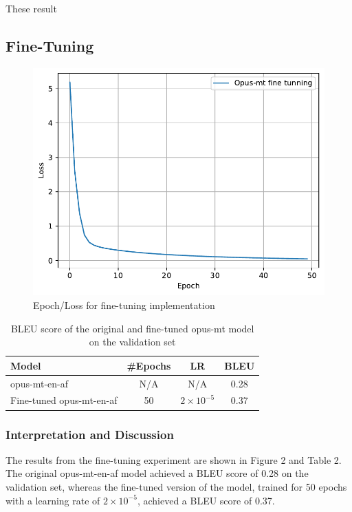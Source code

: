 These result
\subsection{Fine-Tuning}
\begin{figure}[H]
	\centering
	\includegraphics[width=0.9\linewidth]{./figures/fine_tunning.pdf}
	\caption{Epoch/Loss for fine-tuning implementation}
\end{figure}

\begin{table}[H]
	\centering
	\begin{tabular}{lccc}
		\toprule
		Model                 & \#Epochs & LR              & BLEU \\
		\midrule
		opus-mt-en-af         & N/A      & N/A             & 0.28 \\
		Fine-tuned opus-mt-en-af & 50      & $2\times10^{-5}$ & 0.37 \\
		\bottomrule
	\end{tabular}
	\caption{BLEU score of the original and fine-tuned opus-mt model on the validation set}
\end{table}

\subsubsection{Interpretation and Discussion}
The results from the fine-tuning experiment are shown in Figure 2 and Table 2. The original opus-mt-en-af model achieved a BLEU score of 0.28 on the validation set, whereas the fine-tuned version of the model, trained for 50 epochs with a learning rate of $2\times10^{-5}$, achieved a BLEU score of 0.37.

